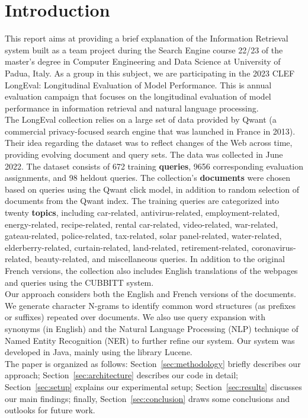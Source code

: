 \section{Introduction}\label{sec:introduction}
This report aims at providing a brief explanation of the Information Retrieval system built
as a team project during the Search Engine course 22/23 of the master’s degree in Computer
Engineering and Data Science at University of Padua, Italy.
As a group in this subject, we are participating in the 2023 CLEF LongEval: Longitudinal Evaluation of Model
Performance.
This is annual evaluation campaign that focuses on the longitudinal evaluation of model performance in information
retrieval and natural language processing.\\
The LongEval collection\cite{traindata} relies on a large set of data provided by Qwant (a commercial privacy-focused
search engine that was launched in France in 2013). %
Their idea regarding the dataset was to reflect changes of the Web across time, providing evolving document and query
sets.
The data was collected in June 2022.
The dataset consists of 672 training \textbf{queries}, 9656 corresponding evaluation assignments, and 98 heldout queries.
The collection's \textbf{documents} were chosen based on queries using the Qwant click model, in addition to random
selection of documents from the Qwant index.
The training queries are categorized into twenty \textbf{topics}, including car-related, antivirus-related,
employment-related, energy-related, recipe-related, rental car-related, video-related, war-related, gateau-related,
police-related, tax-related, solar panel-related, water-related, elderberry-related, curtain-related, land-related,
retirement-related, coronavirus-related, beauty-related, and miscellaneous queries.
In addition to the original French versions, the collection also includes English translations of the webpages and
queries using the CUBBITT system.\\
Our approach considers both the English and French versions of the documents.
We generate character N-grams to identify common word structures (as prefixes or suffixes) repeated over documents.
We also use query expansion with synonyms (in English) and the Natural Language Processing (NLP) technique of Named
Entity Recognition (NER) to further refine our system.
Our system was developed in Java, mainly using the library Lucene.\\
The paper is organized as follows:
Section~\ref{sec:methodology} briefly describes our approach;
Section~\ref{sec:architecture} describes our code in detail;
Section~\ref{sec:setup} explains our experimental setup;
Section~\ref{sec:results} discusses our main findings; finally,
Section~\ref{sec:conclusion} draws some conclusions and outlooks for future work.